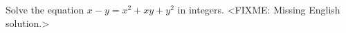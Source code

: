 \problem
Solve the equation $x - y = x^2 + x y + y^2$ in integers.
\solution
<FIXME: Missing English solution.>
\endproblem
